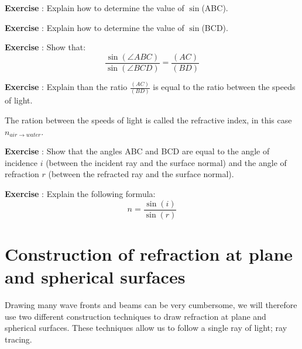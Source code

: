 \documentclass[12pt,a4paper]{article}
\numberwithin{equation}{section}
\numberwithin{figure}{section}
\newcounter{Exercise}
\numberwithin{table}{section}
\begin{document}
\begin{shaded}
\textbf{Exercise \theExercise {}} : Explain how to determine the value of $\sin$(\angle ABC).\end{shaded}
\begin{shaded}
\textbf{Exercise \theExercise {}} : Explain how to determine the value of $\sin$(\angle BCD).\end{shaded}
\begin{shaded}
\textbf{Exercise \theExercise {}} : Show that: \begin{equation} \frac{\sin(\angle ABC)}{\sin(\angle BCD)} = \frac{(AC)}{(BD)} \end{equation}\end{shaded}
\begin{shaded}
\textbf{Exercise \theExercise {}} : Explain than the ratio $\frac{(AC)}{(BD)}$ is equal to the ratio between the speeds of light.\end{shaded}

The ration between the speeds of light is called the refractive index, in this case $n_{air \rightarrow water}$.

\begin{shaded}
\textbf{Exercise \theExercise {}} : Show that the angles \angle ABC and \angle BCD are equal to the angle of incidence $i$ (between the incident ray and the surface normal) and the angle of refraction $r$ (between the refracted ray and the surface normal).\end{shaded}
\begin{shaded}
\textbf{Exercise \theExercise {}} : Explain the following formula\footnotemark: \begin{equation} n = \frac{\sin(i)}{\sin(r)}\end{equation}\end{shaded}

\section{Construction of refraction at plane and spherical surfaces}
Drawing many wave fronts and beams can be very cumbersome, we will therefore use two different construction techniques to draw refraction at plane and spherical surfaces. These techniques allow us to follow a single ray of light; ray tracing. 
\end{document}
